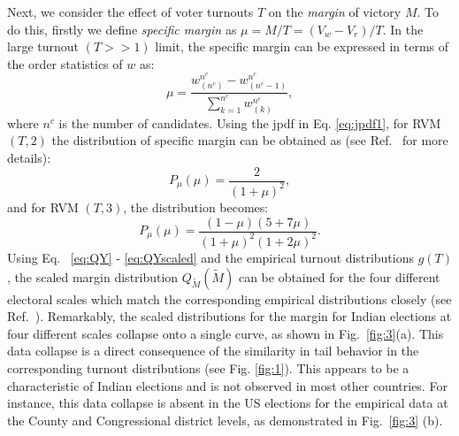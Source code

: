 \documentclass[reprint, pre, twocolumn, aps, showpacs, superscriptaddress]{revtex4-2}
\begin{document}
Next, we consider the effect of voter turnouts $T$ on the \emph{margin} of victory $M$. To do this, firstly we define {\it specific margin} as $\mu = M / T = (V_w - V_r) / T$. In the large turnout $(T >> 1)$ limit, the specific margin can be expressed in terms of the order statistics of $w$ as:
\begin{equation}
    \mu = \frac{w^{n^c}_{(n^c)} - w^{n^c}_{(n^c - 1)}}{\sum_{k = 1}^{n^c}w^{n^c}_{(k)}},
\end{equation}
where $n^c$ is the number of candidates. Using the jpdf in Eq. \ref{eq:jpdf1}, for RVM $(T, 2)$ the distribution of specific margin can be obtained as (see Ref.~\cite{supp} for more details):
\begin{equation}
    P_{\mu}(\mu) = \frac{2}{(1 + \mu)^2},
\end{equation}
and for RVM $(T, 3)$, the distribution becomes:
\begin{equation}
    P_{\mu}(\mu) = \frac{(1 - \mu)(5 + 7\mu)}{(1 + \mu)^2(1 + 2\mu)^2}.
    \label{eq:24}
\end{equation}
Using Eq.~ \ref{eq:QY} - \ref{eq:QYscaled} and the empirical turnout distributions $g(T)$, the scaled margin distribution $Q_{\widetilde{M}}(\widetilde{M})$ can be obtained for the four different electoral scales which match the corresponding empirical distributions closely (see Ref.~\cite{supp}). Remarkably, the scaled distributions for the margin for Indian elections at four different scales collapse onto a single curve, as shown in Fig.~\ref{fig:3}(a). This data collapse is a direct consequence of the similarity in tail behavior in the corresponding turnout distributions (see Fig. \ref{fig:1}). This appears to be a characteristic of Indian elections and is not observed in most other countries. For instance, this data collapse is absent in the US elections for the empirical data at the County and Congressional district levels, as demonstrated in Fig.~\ref{fig:3} (b).
\end{document}
